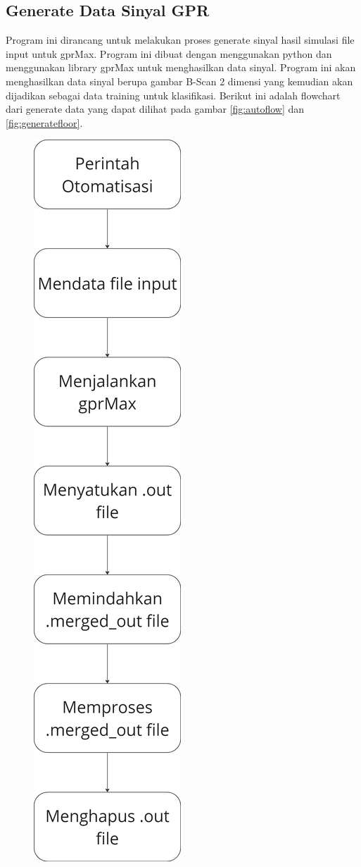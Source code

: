 \subsection{Generate Data Sinyal GPR}
Program ini dirancang untuk melakukan proses generate sinyal hasil simulasi file input untuk gprMax. Program ini dibuat dengan menggunakan python dan menggunakan library gprMax untuk menghasilkan data sinyal. Program ini akan menghasilkan data sinyal berupa gambar B-Scan 2 dimensi yang kemudian akan dijadikan sebagai data training untuk klasifikasi. Berikut ini adalah flowchart dari generate data yang dapat dilihat pada gambar \ref{fig:autoflow} dan \ref{fig:generatefloor}.

\begin{minipage}{\linewidth}
  \begin{figure} [H] \centering
    \includegraphics[scale=0.1]{gambar/bab3/autoflow.png}

\end{figure}
\end{minipage}
